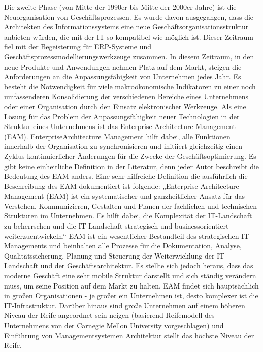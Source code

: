 \documentclass[
	A4paper,
	DIV=9,
	BCOR7mm,
	smallheadings,
	headinclude,
	footinclude,
	headsepline,
	parindent,
	german,
	captions=tableheading,
	abstracton
	]{scrreprt}
\begin{document}
Die zweite Phase (von Mitte der 1990er bis Mitte der 2000er Jahre) ist die Neuorganisation von Geschäftsprozessen. Es wurde davon ausgegangen, dass die Architekten des Informationssystems eine neue Geschäftsorganisationsstruktur anbieten würden, die mit der IT so kompatibel wie möglich ist. Dieser Zeitraum fiel mit der Begeisterung für ERP-Systeme und Geschäftsprozessmodellierungswerkzeuge zusammen.
In diesem Zeitraum, in den neue Produkte und Anwendungen  nehmen Platz auf dem Markt, steigen die Anforderungen an die Anpassungsfähigkeit von Unternehmen jedes Jahr. Es besteht die Notwendigkeit für viele makroökonomische Indikatoren zu einer noch umfassenderen Konsolidierung der verschiedenen  Bereiche eines Unternehmens oder einer Organisation durch den Einsatz elektronischer Werkzeuge.
Als eine Lösung für das Problem der Anpassungsfähigkeit neuer Technologien in der Struktur eines Unternehmens ist das Enterprise Architecture Management (EAM). EnterpriseArchitecture Management hilft dabei, alle Funktionen innerhalb der Organisation zu synchronisieren und initiiert gleichzeitig einen Zyklus kontinuierlicher Änderungen für die Zwecke der Geschäftsoptimierung.
Es gibt keine einheitliche Definition in der Literatur, denn jeder Autor beschreibt die Bedeutung des EAM anders. Eine sehr hilfreiche Definition die ausführlich die Beschreibung des EAM dokumentiert ist folgende:
„Enterprise Architecture Management (EAM) ist ein systematischer und ganzheitlicher Ansatz für das Verstehen, Kommunizieren, Gestalten und Planen der fachlichen und technischen Strukturen im Unternehmen. Es hilft dabei, die Komplexität der IT-Landschaft zu beherrschen und die IT-Landschaft strategisch und businessorientiert  weiterzuentwickeln.“ \autocite{Hanschke2016}
EAM ist ein wesentlicher Bestandteil des strategischen IT-Managements und beinhalten alle Prozesse für die Dokumentation, Analyse, Qualitätssicherung, Planung und Steuerung der Weiterwicklung der IT-Landschaft und der Geschäftsarchitektur.
Es stellte sich jedoch heraus, dass das moderne Geschäft eine sehr mobile Struktur darstellt und sich ständig verändern muss, um seine Position auf dem Markt zu halten.
EAM findet sich hauptsächlich in großen Organisationen - je großer ein Unternehmen ist, desto komplexer ist die IT-Infrastruktur. Darüber hinaus sind große Unternehmen auf einem höheren Niveau der Reife angeordnet sein neigen (basierend Reifemodell des Unternehmens von der Carnegie Mellon University vorgeschlagen) und Einführung von Managementsystemen Architektur stellt das höchste Niveau der Reife. 
\end{document}
